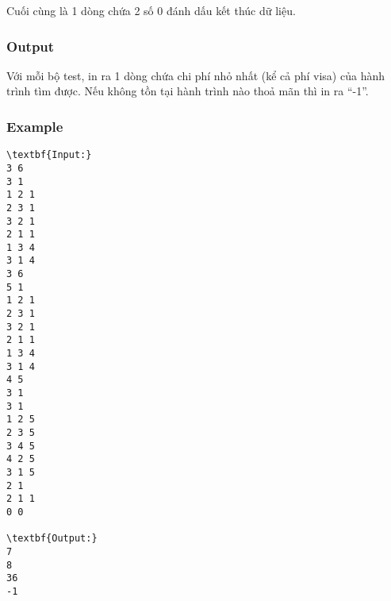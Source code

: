       Cuối cùng là 1 dòng chứa 2 số 0 đánh dấu kết thúc dữ liệu.     

\subsubsection{      Output     }

      Với mỗi bộ test, in ra 1 dòng chứa chi phí nhỏ nhất (kể cả phí visa) của hành trình tìm được. Nếu không tồn tại hành trình nào thoả mãn thì in ra “-1”.     

\subsubsection{      Example     }
\begin{verbatim}
\textbf{Input:}
3 6
3 1
1 2 1
2 3 1
3 2 1
2 1 1
1 3 4
3 1 4
3 6
5 1
1 2 1
2 3 1
3 2 1
2 1 1
1 3 4
3 1 4
4 5
3 1
3 1
1 2 5
2 3 5
3 4 5
4 2 5
3 1 5
2 1
2 1 1
0 0

\textbf{Output:}
7
8
36
-1\end{verbatim}

